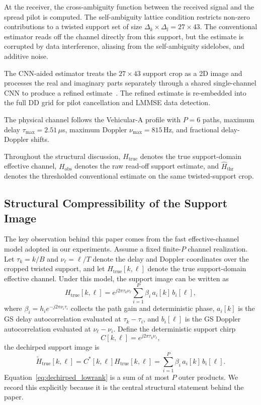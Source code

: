 \documentclass[conference]{IEEEtran}
\begin{document}
At the receiver, the cross-ambiguity function between the received signal and the spread pilot is computed. The self-ambiguity lattice condition restricts non-zero contributions to a twisted support set of size $\Delta_k \times \Delta_l = 27 \times 43$. The conventional estimator reads off the channel directly from this support, but the estimate is corrupted by data interference, aliasing from the self-ambiguity sidelobes, and additive noise.

The CNN-aided estimator treats the $27 \times 43$ support crop as a 2D image and processes the real and imaginary parts separately through a shared single-channel CNN to produce a refined estimate~\cite{zakotfs2024}. The refined estimate is re-embedded into the full DD grid for pilot cancellation and LMMSE data detection.

The physical channel follows the Vehicular-A profile with $P = 6$ paths, maximum delay $\tau_{\max} = 2.51\,\mu$s, maximum Doppler $\nu_{\max} = 815$\,Hz, and fractional delay-Doppler shifts.

Throughout the structural discussion, $H_{\mathrm{true}}$ denotes the true support-domain effective channel, $H_{\mathrm{obs}}$ denotes the raw read-off support estimate, and $\widehat{H}_{\mathrm{thr}}$ denotes the thresholded conventional estimate on the same twisted-support crop.

\subsection{Structural Compressibility of the Support Image}

The key observation behind this paper comes from the fast effective-channel model adopted in our experiments. Assume a fixed finite-$P$ channel realization. Let $\tau_k = k/B$ and $\nu_\ell = \ell/T$ denote the delay and Doppler coordinates over the cropped twisted support, and let $H_{\mathrm{true}}[k,\ell]$ denote the true support-domain effective channel. Under this model, the support image can be written as
\begin{equation}
H_{\mathrm{true}}[k,\ell] =
e^{j 2 \pi \tau_k \nu_\ell}
\sum_{i=1}^{P}
\beta_i \, a_i[k] \, b_i[\ell],
\label{eq:fast_factorization}
\end{equation}
where $\beta_i = h_i e^{-j 2 \pi \nu_i \tau_i}$ collects the path gain and deterministic phase, $a_i[k]$ is the GS delay autocorrelation evaluated at $\tau_k - \tau_i$, and $b_i[\ell]$ is the GS Doppler autocorrelation evaluated at $\nu_\ell - \nu_i$. Define the deterministic support chirp
\begin{equation}
C[k,\ell] = e^{j 2 \pi \tau_k \nu_\ell},
\end{equation}
the dechirped support image is
\begin{equation}
\widetilde{H}_{\mathrm{true}}[k,\ell] = C^*[k,\ell] H_{\mathrm{true}}[k,\ell]
= \sum_{i=1}^{P} \beta_i \, a_i[k] \, b_i[\ell].
\label{eq:dechirped_lowrank}
\end{equation}
Equation~\eqref{eq:dechirped_lowrank} is a sum of at most $P$ outer products. We record this explicitly because it is the central structural statement behind the paper.
\end{document}
